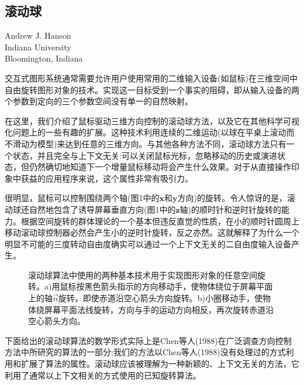 \begin{CJK}{UTF8}{gbsn}
\newpage
\section{滚动球}

\begin{center}
\small{
Andrew J. Hanson\\
Indiana University\\
Bloomington, Indiana}
\end{center}

交互式图形系统通常需要允许用户使用常用的二维输入设备(如鼠标)在三维空间中自由旋转图形对象的技术。实现这一目标受到一个事实的阻碍，即从输入设备的两个参数到定向的三个参数空间没有单一的自然映射。


在这里，我们介绍了鼠标驱动三维方向控制的滚动球方法，以及它在其他科学可视化问题上的一些有趣的扩展。这种技术利用连续的二维运动(以球在平桌上滚动而不滑动为模型)来达到任意的三维方向。与其他各种方法不同，滚动球方法只有一个状态，并且完全与上下文无关:可以关闭鼠标光标，忽略移动的历史或演进状态，但仍然确切地知道下一个增量鼠标移动将会产生什么效果。对于从直接操作印象中获益的应用程序来说，这个属性非常有吸引力。


很明显，鼠标可以控制围绕两个轴(图1中的$\mathbf{x}$和$\mathbf{y}$方向)的旋转。令人惊讶的是，滚动球还自然地包含了诱导屏幕垂直方向(图1中的$\mathbf{z}$轴)的顺时针和逆时针旋转的能力。根据空间旋转的群体理论的一个基本但违反直觉的性质，在小的顺时针圆周上移动滚动球控制器必然会产生小的逆时针旋转，反之亦然。这就解释了为什么一个明显不可能的三度转动自由度确实可以通过一个上下文无关的二自由度输入设备产生。


\begin{figure}
\centering
	\hspace{5pt}
	\caption{滚动球算法中使用的两种基本技术用于实现图形对象的任意空间旋转。a)用鼠标按黑色箭头指示的方向移动手，使物体绕位于屏幕平面上的轴$\vec{n}$旋转，即使赤道沿空心箭头方向旋转。b)小圈移动手，使物体绕屏幕平面法线旋转，方向与手的运动方向相反，再次旋转赤道沿空心箭头方向。}
\end{figure}

下面给出的滚动球算法的数学形式实际上是Chen等人(1988)在广泛调查方向控制方法中所研究的算法的一部分;我们的方法以Chen等人(1988)没有处理过的方式利用和扩展了算法的属性。滚动球应该被理解为一种新颖的、上下文无关的方法，它利用了通常以上下文相关的方式使用的已知旋转算法。



\end{CJK}
